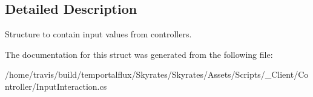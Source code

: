\subsection{Detailed Description}
Structure to contain input values from controllers. 



The documentation for this struct was generated from the following file\-:\begin{DoxyCompactItemize}
\item 
/home/travis/build/temportalflux/\-Skyrates/\-Skyrates/\-Assets/\-Scripts/\-\_\-\-Client/\-Controller/Input\-Interaction.\-cs\end{DoxyCompactItemize}
